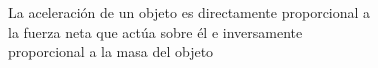 \documentclass[preview]{standalone}
\begin{document}
\begin{center}
La aceleración de un objeto es directamente proporcional a\\ la fuerza neta que actúa sobre él e inversamente\\ proporcional a la masa del objeto
\end{center}
\end{document}
